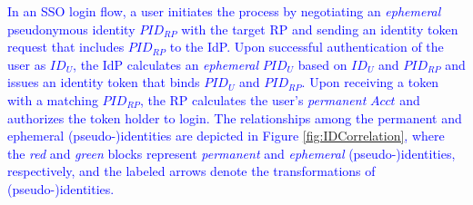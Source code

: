 \textcolor{blue}{In an SSO login flow,
a user initiates the process by negotiating an \emph{ephemeral} pseudonymous identity $PID_{RP}$  with the target RP and sending an identity token request that includes $PID_{RP}$ to the IdP.
Upon successful authentication of the user as $ID_U$, the IdP calculates an \emph{ephemeral} $PID_U$ based on $ID_U$ and $PID_{RP}$ and issues an identity token that binds $PID_U$ and $PID_{RP}$. Upon receiving a token with a matching $PID_{RP}$, the RP calculates the user's \emph{permanent} $Acct$ and authorizes the token holder to login.
%
The relationships among the permanent and ephemeral (pseudo-)identities are depicted in Figure \ref{fig:IDCorrelation}, where the \emph{red} and \emph{green} blocks represent \emph{permanent} and \emph{ephemeral} (pseudo-)identities, respectively, and
the labeled arrows denote the transformations of (pseudo-)identities.}


